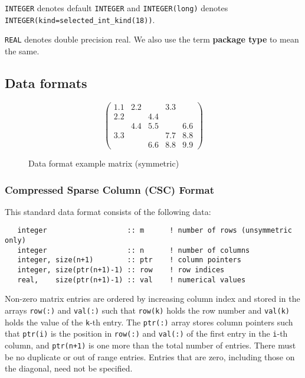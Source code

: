 {\tt INTEGER} denotes default {\tt INTEGER} and
{\tt INTEGER(long)} denotes {\tt INTEGER(kind=selected\_int\_kind(18))}.

\noindent
{\tt REAL} denotes double precision real.
We also use the term {\bf package type} to mean the same.

\subsection{Data formats} \label{scaling:dataformats}

\begin{figure}
   \caption{ \label{scaling:format eg}
      Data format example matrix (symmetric)
   }
   $$
      \left( \begin{array}{ccccc}
         1.1 & 2.2 &     & 3.3 &     \\
         2.2 &     & 4.4 &     &     \\
             & 4.4 & 5.5 &     & 6.6 \\
         3.3 &     &     & 7.7 & 8.8 \\
             &     & 6.6 & 8.8 & 9.9
      \end{array} \right)
   $$
\end{figure}

\subsubsection{Compressed Sparse Column (CSC) Format}
This standard data format consists of the following data:
\begin{verbatim}
   integer                   :: m      ! number of rows (unsymmetric only)
   integer                   :: n      ! number of columns
   integer, size(n+1)        :: ptr    ! column pointers
   integer, size(ptr(n+1)-1) :: row    ! row indices
   real,    size(ptr(n+1)-1) :: val    ! numerical values
\end{verbatim}
Non-zero matrix entries are ordered by increasing column index and stored in
the arrays \texttt{row(:)} and \texttt{val(:)} such that \texttt{row(k)} holds
the row number and \texttt{val(k)} holds the value of the \texttt{k}-th entry.
The \texttt{ptr(:)} array stores column pointers such that \texttt{ptr(i)} is
the position in \texttt{row(:)} and \texttt{val(:)} of
the first entry in the \texttt{i}-th column, and \texttt{ptr(n+1)} is one more
than the total number of entries. There must be no duplicate or out of range
entries.
Entries that are zero, including those on the diagonal, need not be specified.

